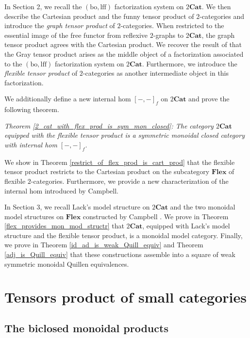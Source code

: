 \documentclass{tac}
\begin{document}
In Section 2, we recall the $(\mathrm{bo},\mathrm{lff})$ factorization
system on $2\mathbf{Cat}$. We then describe the Cartesian product and the
funny tensor product of $2$-categories and introduce the
\emph{graph tensor product} of $2$-categories. When restricted to the
essential image of the free functor from reflexive $2$-graphs to
$2\mathbf{Cat}$, the graph tensor product agrees with the Cartesian
product. We recover the result of \cite{BourkeGurski} that the Gray
tensor product arises as the middle object of a factorization associated
to the $(\mathrm{bo},\mathrm{lff})$ factorization system on
$2\mathbf{Cat}$. Furthermore, we introduce the
\emph{flexible tensor product} of $2$-categories as another intermediate
object in this factorization.

We additionally define a new internal hom $[-,-]_f$ on $2\mathbf{Cat}$ and prove the following theorem.

\begin{center}
 \emph{Theorem \ref{2_cat_with_flex_prod_is_sym_mon_closed}: The category
$2\mathbf{Cat}$ equipped with the flexible tensor product is a symmetric
monoidal closed category with internal hom $[-,-]_f$.}   
\end{center}


We show in Theorem \ref{restrict_of_flex_prod_is_cart_prod} that the
flexible tensor product restricts to the Cartesian product on the
subcategory $\mathbf{Flex}$ of flexible $2$-categories. Furthermore, we
provide a new characterization of the internal hom introduced by
Campbell.

In Section 3, we recall Lack's model structure on $2\mathbf{Cat}$
\cite{Lack2002} and the two monoidal model structures on
$\mathbf{Flex}$ constructed by Campbell \cite{Campbell2026}. We prove in
Theorem \ref{flex_provides_mon_mod_structr} that $2\mathbf{Cat}$,
equipped with Lack's model structure and the flexible tensor product, is
a monoidal model category. Finally, we prove in
Theorem \ref{id_ad_is_weak_Quill_equiv} and Theorem
\ref{adj_is_Quill_equiv} that these constructions assemble into a square
of weak symmetric monoidal Quillen equivalences.


\section{Tensors product of small categories}

\subsection*{The biclosed monoidal products}
\end{document}
